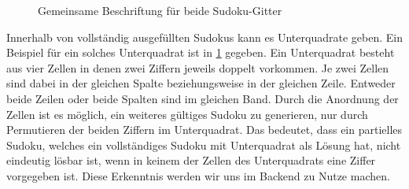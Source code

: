\begin{figure}[H]
\begin{minipage}{0.48\textwidth}
    \end{minipage}
    \caption{Gemeinsame Beschriftung für beide Sudoku-Gitter}
    \label{fig:gemeinsames_sudoku}
\end{figure}

Innerhalb von vollständig ausgefüllten Sudokus kann es Unterquadrate geben.
Ein Beispiel für ein solches Unterquadrat ist in \cref{fig:gemeinsames_sudoku} gegeben.
Ein Unterquadrat besteht aus vier Zellen in denen zwei Ziffern jeweils doppelt vorkommen.
Je zwei Zellen sind dabei in der gleichen Spalte beziehungsweise in der gleichen Zeile.
Entweder beide Zeilen oder beide Spalten sind im gleichen Band.
Durch die Anordnung der Zellen ist es möglich, ein weiteres gültiges Sudoku zu generieren, nur durch Permutieren der beiden Ziffern im Unterquadrat.
Das bedeutet, dass ein partielles Sudoku, welches ein vollständiges Sudoku mit Unterquadrat als Lösung hat, nicht eindeutig lösbar ist,
wenn in keinem der Zellen des Unterquadrats eine Ziffer vorgegeben ist.
Diese Erkenntnis werden wir uns im Backend zu Nutze machen.